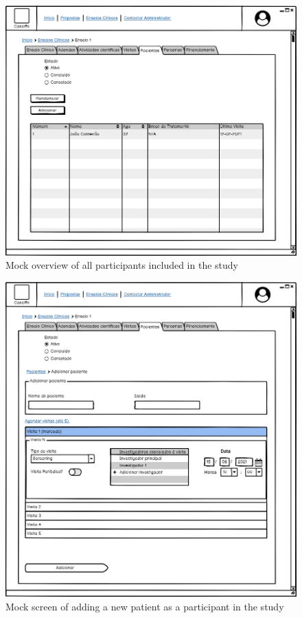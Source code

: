\begin{figure}[H]
    \centering
    \includegraphics[scale=0.35]{images/ensaio-participantes.png}
    \caption{Mock overview of all participants included in the study}
    \label{fig:ensaio-participantes}
\end{figure}

\begin{figure}[H]
    \centering
    \includegraphics[scale=0.35]{images/ensaio-adicionar-paciente.png}
    \caption{Mock screen of adding a new patient as a participant in the study}
    \label{fig:ensaio-adicionar-paciente}
\end{figure}

